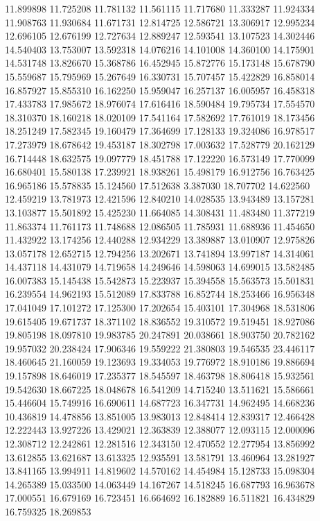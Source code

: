 11.899898
11.725208
11.781132
11.561115
11.717680
11.333287
11.924334
11.908763
11.930684
11.671731
12.814725
12.586721
13.306917
12.995234
12.696105
12.676199
12.727634
12.889247
12.593541
13.107523
14.302446
14.540403
13.753007
13.592318
14.076216
14.101008
14.360100
14.175901
14.531748
13.826670
15.368786
16.452945
15.872776
15.173148
15.678790
15.559687
15.795969
15.267649
16.330731
15.707457
15.422829
16.858014
16.857927
15.855310
16.162250
15.959047
16.257137
16.005957
16.458318
17.433783
17.985672
18.976074
17.616416
18.590484
19.795734
17.554570
18.310370
18.160218
18.020109
17.541164
17.582692
17.761019
18.173456
18.251249
17.582345
19.160479
17.364699
17.128133
19.324086
16.978517
17.273979
18.678642
19.453187
18.302798
17.003632
17.528779
20.162129
16.714448
18.632575
19.097779
18.451788
17.122220
16.573149
17.770099
16.680401
15.580138
17.239921
18.938261
15.498179
16.912756
16.763425
16.965186
15.578835
15.124560
17.512638
3.387030
18.707702
14.622560
12.459219
13.781973
12.421596
12.840210
14.028535
13.943489
13.157281
13.103877
15.501892
15.425230
11.664085
14.308431
11.483480
11.377219
11.863374
11.761173
11.748688
12.086505
11.785931
11.688936
11.454650
11.432922
13.174256
12.440288
12.934229
13.389887
13.010907
12.975826
13.057178
12.652715
12.794256
13.202671
13.741894
13.997187
14.314061
14.437118
14.431079
14.719658
14.249646
14.598063
14.699015
13.582485
16.007383
15.145438
15.542873
15.223937
15.394558
15.563573
15.501831
16.239554
14.962193
15.512089
17.833788
16.852744
18.253466
16.956348
17.041049
17.101272
17.125300
17.202654
15.403101
17.304968
18.531806
19.615405
19.671737
18.371102
18.836552
19.310572
19.519451
18.927086
19.805198
18.097810
19.983785
20.247891
20.038661
18.903750
20.782162
19.957032
20.238424
17.906346
19.559222
21.380803
19.546535
23.446117
18.460645
21.160059
19.123693
19.334053
19.776972
18.910186
19.886694
19.157898
18.646019
17.235377
18.545597
18.463798
18.806418
15.932561
19.542630
18.667225
18.048678
16.541209
14.715240
13.511621
15.586661
15.446604
15.749916
16.690611
14.687723
16.347731
14.962495
14.668236
10.436819
14.478856
13.851005
13.983013
12.848414
12.839317
12.466428
12.222443
13.927226
13.429021
12.363839
12.388077
12.093115
12.000096
12.308712
12.242861
12.281516
12.343150
12.470552
12.277954
13.856992
13.612855
13.621687
13.613325
12.935591
13.581791
13.460964
13.281927
13.841165
13.994911
14.819602
14.570162
14.454984
15.128733
15.098304
14.265389
15.033500
14.063449
14.167267
14.518245
16.687793
16.963678
17.000551
16.679169
16.723451
16.664692
16.182889
16.511821
16.434829
16.759325
18.269853
